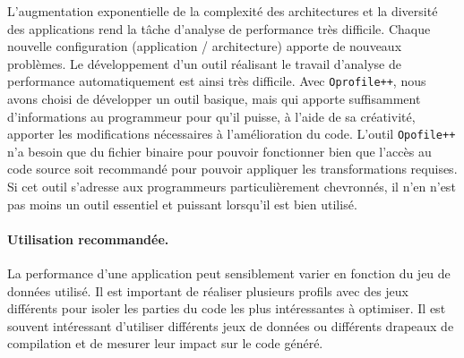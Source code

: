     L'augmentation exponentielle de la complexité des architectures et la diversité des applications rend la tâche d'analyse de performance très difficile. Chaque nouvelle configuration (application / architecture) apporte de nouveaux problèmes. Le développement d'un outil réalisant le travail d'analyse de performance automatiquement est ainsi très difficile. Avec \verb|Oprofile++|, nous avons choisi de développer un outil basique, mais qui apporte suffisamment d'informations au programmeur pour qu'il puisse, à l'aide de sa créativité, apporter les modifications nécessaires à l'amélioration du code. L'outil \verb|Opofile++| n'a besoin que du fichier binaire pour pouvoir fonctionner bien que l'accès au code source soit recommandé pour pouvoir appliquer les transformations requises. Si cet outil s'adresse aux programmeurs particulièrement chevronnés, il n'en n'est pas moins un outil essentiel et puissant lorsqu'il est bien utilisé. 
    
     

    \paragraph{Utilisation recommandée.} La performance d'une application peut sensiblement varier en fonction du jeu de données utilisé. Il est important de réaliser plusieurs profils avec des jeux différents pour isoler les parties du code les plus intéressantes à optimiser. Il est souvent intéressant d'utiliser différents jeux de données ou différents drapeaux de compilation et de mesurer leur impact sur le code généré. 
  

    